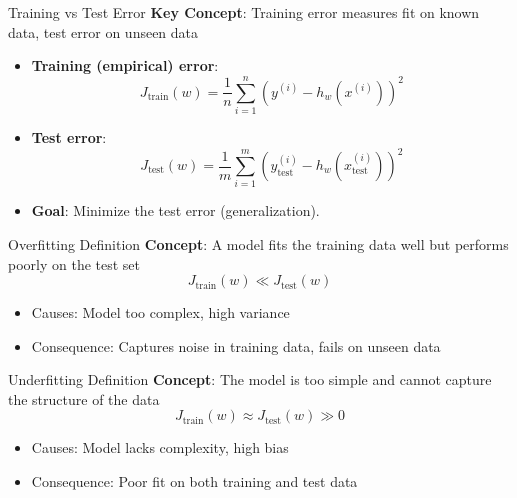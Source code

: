 \documentclass[serif, aspectratio=169]{beamer}
\begin{document}
    \begin{frame}{Training vs Test Error}
        \textbf{Key Concept}: Training error measures fit on known data, test error on unseen data
        \begin{itemize}
            \item \textbf{Training (empirical) error}:
            \[
                J_{\text{train}}(w) = \frac{1}{n} \sum_{i=1}^{n} \left( y^{(i)} - h_w(x^{(i)}) \right)^2
            \]
            \item \textbf{Test error}:
            \[
                J_{\text{test}}(w) = \frac{1}{m} \sum_{i=1}^{m} \left(y_{\text{test}}^{(i)} - h_w(x_{\text{test}}^{(i)})\right)^2
            \]
            \item \textbf{Goal}: Minimize the test error (generalization).
        \end{itemize}
    \end{frame}

    \begin{frame}{Overfitting Definition}
        \textbf{Concept}: A model fits the training data well but performs poorly on the test set
        \[
            J_{\text{train}}(w) \ll J_{\text{test}}(w)
        \]
        \begin{itemize}
            \item Causes: Model too complex, high variance
            \item Consequence: Captures noise in training data, fails on unseen data
        \end{itemize}
    \end{frame}



    \begin{frame}{Underfitting Definition}
        \textbf{Concept}: The model is too simple and cannot capture the structure of the data
        \[
            J_{\text{train}}(w) \approx J_{\text{test}}(w) \gg 0
        \]
        \begin{itemize}
            \item Causes: Model lacks complexity, high bias
            \item Consequence: Poor fit on both training and test data
        \end{itemize}
    \end{frame}
\end{document}
